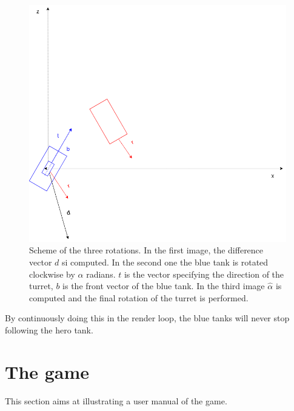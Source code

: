 \documentclass[14pt]{article}
\begin{document}
\begin{figure}[H]
\begin{minipage}[t]{0.6\textwidth}
\center
\includegraphics[width=\textwidth]{diagrams/chartSecondRot.png}
\end{minipage}
\caption{Scheme of the three rotations. In the first image, the difference vector \(d\) si computed. In the second one the blue tank is rotated clockwise by \(\alpha\) radians. \(t\) is the vector specifying the direction of the turret, \(b\) is the front vector of the blue tank. In the third image \(\hat{\alpha}\) is computed and the final rotation of the turret is performed.}
\label{img:threeOrientations}
\end{figure}




By continuously doing this in the render loop, the blue tanks will never stop following the hero tank. 
\section{The game}\label{sec:theGame}
This section aims at illustrating a user manual of the game. 
\end{document}
